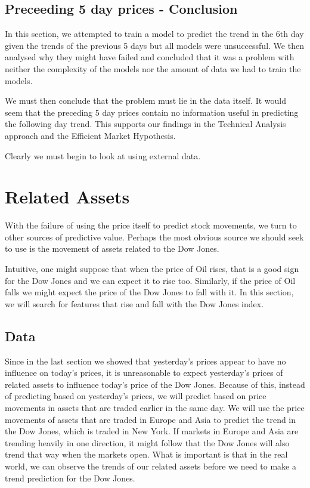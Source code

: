 \documentclass{report}
\begin{document}
\subsection{Preceeding 5 day prices - Conclusion}

In this section, we attempted to train a model to predict the trend in the 6th day given the trends of the previous 5 days but all models were unsuccessful. We then analysed why they might have failed and concluded that it was a problem with neither the complexity of the models nor the amount of data we had to train the models.

We must then conclude that the problem must lie in the data itself. It would seem that the preceding 5 day prices contain no information useful in predicting the following day trend. This supports our findings in the Technical Analysis approach and the Efficient Market Hypothesis.

Clearly we must begin to look at using external data.

\section{Related Assets}

With the failure of using the price itself to predict stock movements, we turn to other sources of predictive value. Perhaps the most obvious source we should seek to use is the movement of assets related to the Dow Jones.

Intuitive, one might suppose that when the price of Oil rises, that is a good sign for the Dow Jones and we can expect it to rise too. Similarly, if the price of Oil falls we might expect the price of the Dow Jones to fall with it. In this section, we will search for features that rise and fall with the Dow Jones index.

\subsection{Data}

Since in the last section we showed that yesterday's prices appear to have no influence on today’s prices, it is unreasonable to expect yesterday's prices of related assets to influence today's price of the Dow Jones. Because of this, instead of predicting based on yesterday's prices, we will predict based on price movements in assets that are traded earlier in the same day. We will use the price movements of assets that are traded in Europe and Asia to predict the trend in the Dow Jones, which is traded in New York. If markets in Europe and Asia are trending heavily in one direction, it might follow that the Dow Jones will also trend that way when the markets open. What is important is that in the real world, we can observe the trends of our related assets before we need to make a trend prediction for the Dow Jones.
\end{document}
